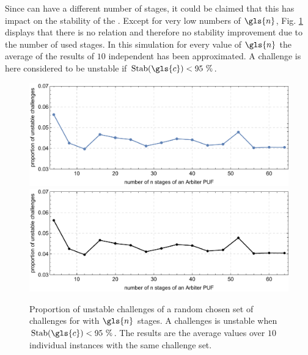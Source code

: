Since \apufs can have a different number of stages, it could be claimed that this has impact on the stability of the \puf.
Except for very low numbers of $\gls{n}$, Fig. \ref{fig:arbiterstabilities} displays that there is no relation and therefore no stability improvement due to the number of used stages. %
In this simulation for every value of $\gls{n}$ the average of the results of $10$ independent \apufs has been approximated.
A challenge is here considered to be unstable if $\Stab(\gls{c}) < 95\ \%$.


\begin{figure}[ht]
\ifx{}\undefined
{}
\else
	\if{}
\centering
\includegraphics[width=1.00\textwidth]{images/stages-stab-simulation.pdf}
	\else
\includegraphics[width=1.00\textwidth]{images/stages-stab-simulation_mono.pdf}
    \fi
\fi
\caption[Proportion of unstable challenges of an \apuf]{Proportion of unstable challenges of a random chosen set of challenges for \apufs with $\gls{n}$ stages. 
A challenges is unstable when $\Stab(\gls{c}) < 95\ \%$. 
The results are the average values over $10$ individual \puf instances with the same challenge set.} 
\label{fig:arbiterstabilities}
\end{figure}


